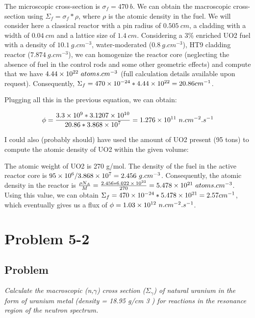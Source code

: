 The microscopic cross-section is $\sigma_f = 470\ b$. We can obtain the macroscopic cross-section using $\Sigma_f = \sigma_f * \rho$, where $\rho$ is the atomic density in the fuel. We will consider here a classical reactor with a pin radius of $0.505\ cm$, a cladding with a width of $0.04\ cm$ and a lattice size of $1.4\ cm$. Considering a 3\% enriched UO2 fuel with a density of $10.1\ g.cm^{-3}$, water-moderated ($0.8\ g.cm^{-3}$), HT9 cladding reactor ($7.874\ g.cm^{-3}$), we can homogenize the reactor core (neglecting the absence of fuel in the control rods and some other geometric effects) and compute that we have $\text{\num{4.44e22}}\ atoms.cm^{-3}$ (full calculation details available upon request). Consequently, $\Sigma_f = \text{\num{470e-24}} * \text{\num{4.44e22}} = 20.86 cm^{-1}$.

Plugging all this in the previous equation, we can obtain:


\begin{equation}
\phi = \frac{\text{\num{3.3e9}} * \text{\num{3.1207e10}}}{20.86 * \text{\num{3.868e7}}} = \text{\num{1.276e11}}\ n.cm^{-2}.s^{-1}
\end{equation}

I could also (probably should) have used the amount of UO2 present (95 tons) to compute the atomic density of UO2 within the given volume:

The atomic weight of UO2 is 270 g/mol. The density of the fuel in the active reactor core is $\text{\num{95e6}} / \text{\num{3.868e7}} = 2.456\ g.cm^{-3}$. Consequently, the atomic density in the reactor is $\frac{\rho N_A}{M} = \frac{2.456 * \text{\num{6.022e23}}}{270} = \text{\num{5.478e21}}\ atoms.cm^{-3}$. Using this value, we can obtain $\Sigma_f = \text{\num{470e-24}} * \text{\num{5.478e21}} = 2.57 cm^{-1}$, which eventually gives us a flux of $\phi = \text{\num{1.03e12}}\ n.cm^{-2}.s^{-1}$.

\section{Problem 5-2}
\label{prob52}


\subsection{Problem}
\textit{Calculate the macroscopic (n,$\gamma$) cross section ($\Sigma_{\gamma}$) of natural uranium in the form of uranium metal (density = 18.95 g/cm 3 ) for reactions in the resonance region of the neutron spectrum.}

